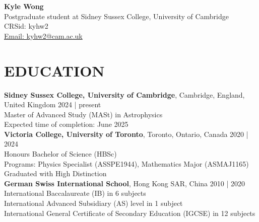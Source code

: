 \documentclass[a4paper,10pt]{extarticle}
\begin{document}
\pagestyle{fancy}
\renewcommand{\headrulewidth}{0pt}
\fancyhead{}
\fancyhead[R]{\textit{\monthyeardate\today}}
\thispagestyle{empty} %

\begin{flushleft}
\textbf{\LARGE Kyle Wong}\\[2pt] %
Postgraduate student at Sidney Sussex College, University of Cambridge
\\ {CRSid: kyhw2} \\
\href{mailto:kyhw2@cam.ac.uk}{Email: kyhw2@cam.ac.uk} %
\end{flushleft}

\section*{EDUCATION}
\textbf{Sidney Sussex College, University of Cambridge}, Cambridge, England, United Kingdom \hfill 2024 | present\\
Master of Advanced Study (MASt) in Astrophysics\\
Expected time of completion: June 2025\\



\textbf{Victoria College, University of Toronto}, Toronto, Ontario, Canada \hfill 2020 | 2024\\ %
Honours Bachelor of Science (HBSc)\\
Programs: Physics Specialist (ASSPE1944), Mathematics Major (ASMAJ1165)\\ 
Graduated with High Distinction\\


\textbf{German Swiss International School}, Hong Kong SAR, China \hfill 2010 | 2020\\ %
International Baccalaureate (IB) in 6 subjects\\
International Advanced Subsidiary (AS) level in 1 subject\\
International General Certificate of Secondary Education (IGCSE) in 12 subjects

\end{document}
